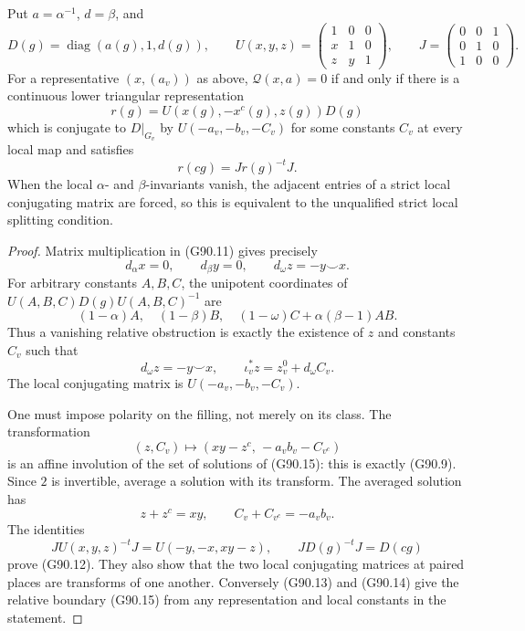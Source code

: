 \begin{proposition}
\label{AC-G90-fill}
Put \(a=\alpha^{-1}\), \(d=\beta\), and
\[
 D(g)=\operatorname{diag}(a(g),1,d(g)),\qquad
 U(x,y,z)=
 \begin{pmatrix}1&0&0\\x&1&0\\z&y&1\end{pmatrix},\qquad
 J=\begin{pmatrix}0&0&1\\0&1&0\\1&0&0\end{pmatrix}.
 \tag{G90.10}
\]
For a representative \((x,(a_v))\) as above, \(\mathcal Q(x,a)=0\)
if and only if there is a continuous lower triangular representation
\[
 r(g)=U(x(g),-x^c(g),z(g))D(g)
 \tag{G90.11}
\]
which is conjugate to \(D|_{G_v}\) by
\(U(-a_v,-b_v,-C_v)\) for some constants \(C_v\)
at every local map and satisfies
\[
 r(cg)=Jr(g)^{-t}J.
 \tag{G90.12}
\]
When the local \(\alpha\)- and \(\beta\)-invariants vanish,
the adjacent entries of a strict local conjugating matrix are forced,
so this is equivalent to the unqualified strict local splitting
condition.
\end{proposition}

\begin{proof}
Matrix multiplication in (G90.11) gives precisely
\[
 d_\alpha x=0,\qquad d_\beta y=0,\qquad
 d_\omega z=-y\smile x.
 \tag{G90.13}
\]
For arbitrary constants \(A,B,C\), the unipotent coordinates of
\(U(A,B,C)D(g)U(A,B,C)^{-1}\) are
\[
 (1-\alpha)A,\quad (1-\beta)B,\quad
           (1-\omega)C+\alpha(\beta-1)AB.
 \tag{G90.14}
\]
Thus a vanishing relative obstruction is exactly the existence of
\(z\) and constants \(C_v\) such that
\[
 d_\omega z=-y\smile x,\qquad
 \iota_v^*z=z_v^0+d_\omega C_v.
 \tag{G90.15}
\]
The local conjugating matrix is \(U(-a_v,-b_v,-C_v)\).

One must impose polarity on the filling, not merely on its class.
The transformation
\[
 (z,C_v)\longmapsto
        (xy-z^c,\,-a_vb_v-C_{v^c})
 \tag{G90.16}
\]
is an affine involution of the set of solutions of (G90.15):
this is exactly (G90.9).  Since \(2\) is invertible, average a solution
with its transform.  The averaged solution has
\[
 z+z^c=xy,\qquad C_v+C_{v^c}=-a_vb_v.
 \tag{G90.17}
\]
The identities
\[
 JU(x,y,z)^{-t}J=U(-y,-x,xy-z),\qquad
 JD(g)^{-t}J=D(cg)
\]
prove (G90.12).  They also show that the two local conjugating
matrices at paired places are transforms of one another.
Conversely (G90.13) and (G90.14) give the relative boundary (G90.15)
from any representation and local constants in the statement.
\end{proof}

